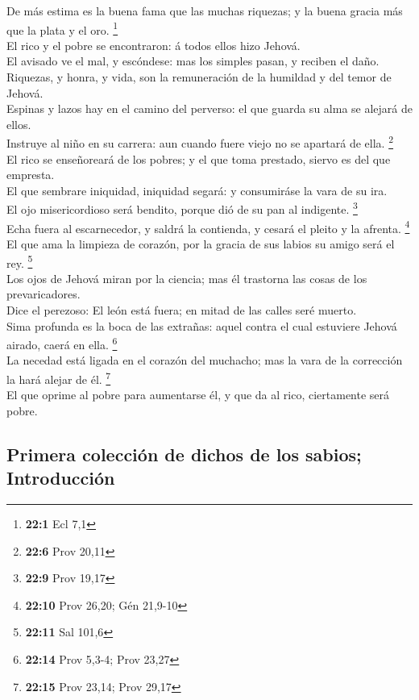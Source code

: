  De más estima es la buena fama que las muchas riquezas; y
la buena gracia más que la plata y el oro. \footnote{\textbf{22:1} Ecl
  7,1}\\
 El rico y el pobre se encontraron: á todos ellos hizo
Jehová.\\
 El avisado ve el mal, y escóndese: mas los simples pasan, y
reciben el daño.\\
 Riquezas, y honra, y vida, son la remuneración de la
humildad y del temor de Jehová.\\
 Espinas y lazos hay en el camino del perverso: el que
guarda su alma se alejará de ellos.\\
 Instruye al niño en su carrera: aun cuando fuere viejo no
se apartará de ella. \footnote{\textbf{22:6} Prov 20,11}\\
 El rico se enseñoreará de los pobres; y el que toma
prestado, siervo es del que empresta.\\
 El que sembrare iniquidad, iniquidad segará: y consumiráse
la vara de su ira.\\
 El ojo misericordioso será bendito, porque dió de su pan al
indigente. \footnote{\textbf{22:9} Prov 19,17}\\
 Echa fuera al escarnecedor, y saldrá la contienda, y
cesará el pleito y la afrenta. \footnote{\textbf{22:10} Prov 26,20; Gén
  21,9-10}\\
 El que ama la limpieza de corazón, por la gracia de sus
labios su amigo será el rey. \footnote{\textbf{22:11} Sal 101,6}\\
 Los ojos de Jehová miran por la ciencia; mas él trastorna
las cosas de los prevaricadores.\\
 Dice el perezoso: El león está fuera; en mitad de las
calles seré muerto.\\
 Sima profunda es la boca de las extrañas: aquel contra el
cual estuviere Jehová airado, caerá en ella. \footnote{\textbf{22:14}
  Prov 5,3-4; Prov 23,27}\\
 La necedad está ligada en el corazón del muchacho; mas la
vara de la corrección la hará alejar de él. \footnote{\textbf{22:15}
  Prov 23,14; Prov 29,17}\\
 El que oprime al pobre para aumentarse él, y que da al
rico, ciertamente será pobre.

\hypertarget{primera-colecciuxf3n-de-dichos-de-los-sabios-introducciuxf3n}{%
\subsection{Primera colección de dichos de los sabios;
Introducción}\label{primera-colecciuxf3n-de-dichos-de-los-sabios-introducciuxf3n}}

